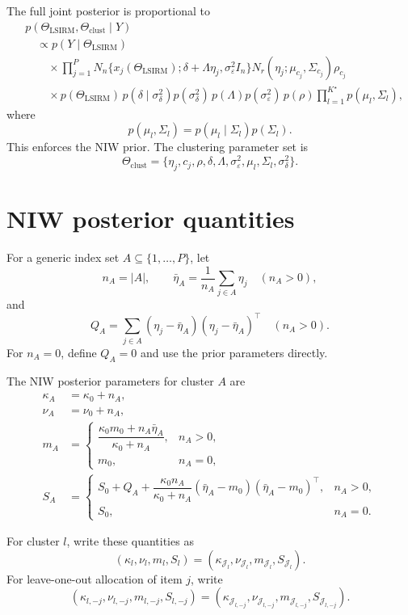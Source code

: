 \documentclass[11pt]{article}
\begin{document}
The full joint posterior is proportional to
\begin{align*}
&p(\Theta_{\mathrm{LSIRM}},\Theta_{\mathrm{clust}}\mid Y)\\
&\quad\propto
p(Y\mid\Theta_{\mathrm{LSIRM}})\\
&\qquad\times
\prod_{j=1}^P
N_n\{x_j(\Theta_{\mathrm{LSIRM}});\delta+\Lambda\eta_j,
\sigma_\varepsilon^2 I_n\}
N_r(\eta_j;\mu_{c_j},\Sigma_{c_j})\rho_{c_j}\\
&\qquad\times
p(\Theta_{\mathrm{LSIRM}})
\,p(\delta\mid\sigma_\delta^2)p(\sigma_\delta^2)
\,p(\Lambda)p(\sigma_\varepsilon^2)
\,p(\rho)
\prod_{l=1}^{K^\star}p(\mu_l,\Sigma_l),
\end{align*}
where
\[
    p(\mu_l,\Sigma_l)
    =p(\mu_l\mid\Sigma_l)p(\Sigma_l).
\]
This enforces the NIW prior.  The clustering parameter set is
\[
\Theta_{\mathrm{clust}}
=\{\eta_j,c_j,\rho,\delta,\Lambda,\sigma_\varepsilon^2,
\mu_l,\Sigma_l,\sigma_\delta^2\}.
\]

\section{NIW posterior quantities}

For a generic index set $A\subseteq\{1,\dots,P\}$, let
\[
    n_A=|A|,
    \qquad
    \bar\eta_A=\frac{1}{n_A}\sum_{j\in A}\eta_j
    \quad(n_A>0),
\]
and
\[
    Q_A=\sum_{j\in A}(\eta_j-\bar\eta_A)(\eta_j-\bar\eta_A)^\top
    \quad(n_A>0).
\]
For $n_A=0$, define $Q_A=0$ and use the prior parameters directly.

The NIW posterior parameters for cluster $A$ are
\begin{align}
    \kappa_A &= \kappa_0+n_A,\\
    \nu_A &= \nu_0+n_A,\\
    m_A &=
    \begin{cases}
    \dfrac{\kappa_0m_0+n_A\bar\eta_A}{\kappa_0+n_A}, & n_A>0,\\[1.25em]
    m_0, & n_A=0,
    \end{cases}\\
    S_A &=
    \begin{cases}
    S_0+Q_A+
    \dfrac{\kappa_0 n_A}{\kappa_0+n_A}
    (\bar\eta_A-m_0)(\bar\eta_A-m_0)^\top, & n_A>0,\\[1.25em]
    S_0, & n_A=0.
    \end{cases}
\end{align}

For cluster $l$, write these quantities as
\[
    (\kappa_l,\nu_l,m_l,S_l)
    = (\kappa_{\mathcal J_l},\nu_{\mathcal J_l},m_{\mathcal J_l},S_{\mathcal J_l}).
\]
For leave-one-out allocation of item $j$, write
\[
    (\kappa_{l,-j},\nu_{l,-j},m_{l,-j},S_{l,-j})
    = (\kappa_{\mathcal J_{l,-j}},\nu_{\mathcal J_{l,-j}},
       m_{\mathcal J_{l,-j}},S_{\mathcal J_{l,-j}}).
\]
\end{document}
